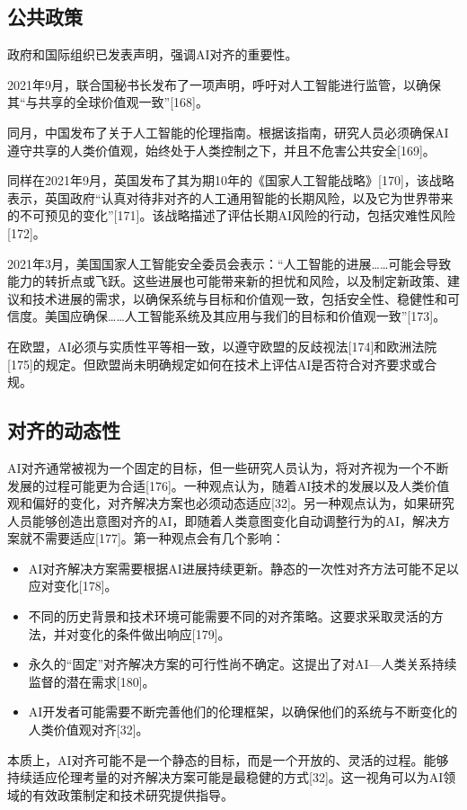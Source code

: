 \subsection{公共政策}   
政府和国际组织已发表声明，强调AI对齐的重要性。

2021年9月，联合国秘书长发布了一项声明，呼吁对人工智能进行监管，以确保其“与共享的全球价值观一致”[168]。

同月，中国发布了关于人工智能的伦理指南。根据该指南，研究人员必须确保AI遵守共享的人类价值观，始终处于人类控制之下，并且不危害公共安全[169]。

同样在2021年9月，英国发布了其为期10年的《国家人工智能战略》[170]，该战略表示，英国政府“认真对待非对齐的人工通用智能的长期风险，以及它为世界带来的不可预见的变化”[171]。该战略描述了评估长期AI风险的行动，包括灾难性风险[172]。

2021年3月，美国国家人工智能安全委员会表示：“人工智能的进展……可能会导致能力的转折点或飞跃。这些进展也可能带来新的担忧和风险，以及制定新政策、建议和技术进展的需求，以确保系统与目标和价值观一致，包括安全性、稳健性和可信度。美国应确保……人工智能系统及其应用与我们的目标和价值观一致”[173]。

在欧盟，AI必须与实质性平等相一致，以遵守欧盟的反歧视法[174]和欧洲法院[175]的规定。但欧盟尚未明确规定如何在技术上评估AI是否符合对齐要求或合规。
\subsection{对齐的动态性}
AI对齐通常被视为一个固定的目标，但一些研究人员认为，将对齐视为一个不断发展的过程可能更为合适[176]。一种观点认为，随着AI技术的发展以及人类价值观和偏好的变化，对齐解决方案也必须动态适应[32]。另一种观点认为，如果研究人员能够创造出意图对齐的AI，即随着人类意图变化自动调整行为的AI，解决方案就不需要适应[177]。第一种观点会有几个影响：
\begin{itemize}
\item AI对齐解决方案需要根据AI进展持续更新。静态的一次性对齐方法可能不足以应对变化[178]。
\item 不同的历史背景和技术环境可能需要不同的对齐策略。这要求采取灵活的方法，并对变化的条件做出响应[179]。
\item 永久的“固定”对齐解决方案的可行性尚不确定。这提出了对AI—人类关系持续监督的潜在需求[180]。
\item AI开发者可能需要不断完善他们的伦理框架，以确保他们的系统与不断变化的人类价值观对齐[32]。
\end{itemize}
本质上，AI对齐可能不是一个静态的目标，而是一个开放的、灵活的过程。能够持续适应伦理考量的对齐解决方案可能是最稳健的方式[32]。这一视角可以为AI领域的有效政策制定和技术研究提供指导。
